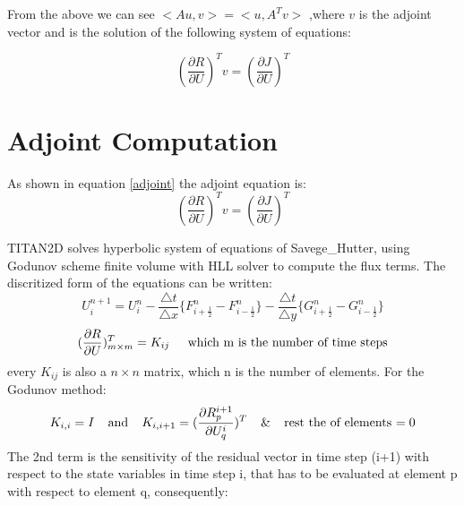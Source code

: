 \documentclass[a4paper,10pt]{article}
\begin{document}
 From the above we can see $<Au,v>=<u,A^Tv>$  
  ,where $v$ is the adjoint vector and is the solution of the following system of equations:
  
  \begin{equation}\label{adjoint}
   (\frac{\partial R}{\partial U})^T v = (\frac{\partial J}{\partial U})^T
  \end{equation}

\section{Adjoint Computation}
 As shown in equation \ref{adjoint} the adjoint equation is:
\begin{equation*}
   (\frac{\partial R}{\partial U})^T v = (\frac{\partial J}{\partial U})^T
  \end{equation*}
  
  TITAN2D solves hyperbolic system of equations of Savege\_Hutter, using Godunov scheme finite volume with HLL solver to compute the flux terms.
The discritized form of the equations can be written:
  \begin{equation}
   \label{explicit}
   U_i^{n+1} = U_i^n - \frac{\bigtriangleup t}{\bigtriangleup x} \{F_{i+\frac{1}{2}}^n - F_{i-\frac{1}{2}}^n \}
   - \frac{\bigtriangleup t}{\bigtriangleup y} \{G_{i+\frac{1}{2}}^n - G_{i-\frac{1}{2}}^n \}
  \end{equation}
  \begin{equation*}
     (\frac{\partial R}{\partial U})_{m \times m}^T = K_{ij} \hspace{.2 in}
     \text{which m is the number of time steps}
  \end{equation*} 
  every  $K_{ij}$ is also a $n \times n$ matrix, which n is the number of elements.
For the Godunov method:
      \begin{equation*}
        K_{i,i} = I \hspace{.15 in} \text{and} \hspace{.15 in} K_{i,i+1}= (\frac{\partial R_p^{i+1}}{\partial U_q^i})^T 
        \hspace{.15 in} \& \hspace{.15 in}  \text{rest the of elements $=0$}
    \end{equation*} 
The 2nd term is the sensitivity of the residual vector in time step (i+1) 
with respect to the state variables in time step i, 
that has to be evaluated at element p with respect to element q, consequently:
\end{document}
